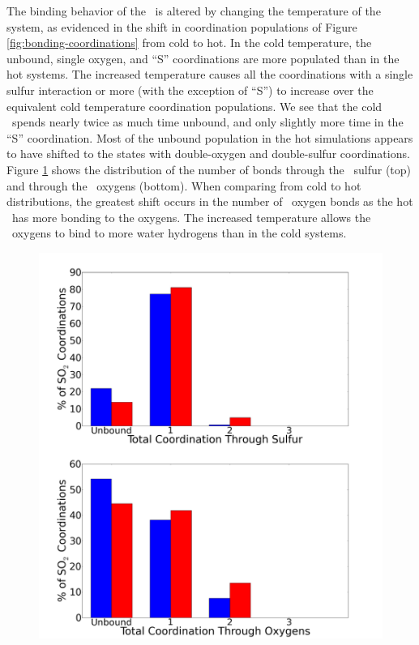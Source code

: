 The binding behavior of the \suldiox~is altered by changing the temperature of the system, as evidenced in the shift in coordination populations of Figure \ref{fig:bonding-coordinations} from cold to hot. In the cold temperature, the unbound, single oxygen, and ``S'' coordinations are more populated than in the hot systems. The increased temperature causes all the coordinations with a single sulfur interaction or more (with the exception of ``S'') to increase over the equivalent cold temperature coordination populations. We see that the cold \suldiox~spends nearly twice as much time unbound, and only slightly more time in the ``S'' coordination. Most of the unbound population in the hot simulations appears to have shifted to the states with double-oxygen and double-sulfur coordinations. Figure \ref{fig:coordination-breakdown} shows the distribution of the number of bonds through the \suldiox~sulfur (top) and through the \suldiox~oxygens (bottom). When comparing from cold to hot distributions, the greatest shift occurs in the number of \suldiox~oxygen bonds as the hot \suldiox~has more bonding to the oxygens. The increased temperature allows the \suldiox~oxygens to bind to more water hydrogens than in the cold systems.

\begin{figure}[h!]
	\begin{center}
		\includegraphics[scale=1.0]{images/coordinations/coordination-breakdown-small.png}
		\caption{}
		\label{fig:coordination-breakdown}
	\end{center}
\end{figure}

